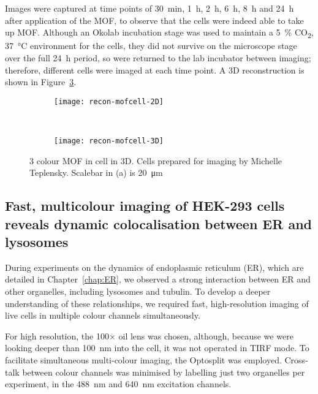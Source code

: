 Images were captured at time points of \SI{30}{\minute}, \SI{1}{\hour}, \SI{2}{\hour}, \SI{6}{\hour}, \SI{8}{\hour} and \SI{24}{\hour} after application of the MOF, to observe that the cells were indeed able to take up MOF.
Although an Okolab incubation stage was used to maintain a \SI{5}{\percent} CO\textsubscript{2}, \SI{37}{\degreeCelsius} environment for the cells, they did not survive on the microscope stage over the full \SI{24}{\hour} period, so were returned to the lab incubator between imaging; therefore, different cells were imaged at each time point. 
A 3D reconstruction is shown in Figure~\ref{fig:recon-mofcell}. 

\begin{figure}[tbp!]
\centering
\begin{subfigure}[b]{0.7\textwidth}
	\texttt{[image: recon-mofcell-2D]}
	\caption{}\label{fig:recon-mofcell-2D}
\end{subfigure}

~\newline
\begin{subfigure}[b]{0.7\textwidth}
	\texttt{[image: recon-mofcell-3D]}
	\caption{}\label{fig:recon-mofcell-3D}
\end{subfigure}
\caption[LAG SIM: 3D reconstruction of HeLa cells]{3 colour MOF in cell in 3D. Cells prepared for imaging by Michelle Teplensky. Scalebar in (a) is \SI{20}{\micro\metre}}
\label{fig:recon-mofcell}
\end{figure}

\subsection{Fast, multicolour imaging of HEK-293 cells reveals dynamic colocalisation between ER and lysosomes}
During experiments on the dynamics of endoplasmic reticulum (ER), which are detailed in Chapter~\ref{chap:ER}, we observed a strong interaction between ER and other organelles, including lysosomes and tubulin. 
To develop a deeper understanding of these relationships, we required fast, high-resolution imaging of live cells in multiple colour channels simultaneously. 

For high resolution, the 100$\times$ oil lens was chosen, although, because we were looking deeper than \SI{100}{\nano\metre} into the cell, it was not operated in TIRF mode. 
To facilitate simultaneous multi-colour imaging, the Optosplit was employed. 
Cross-talk between colour channels was minimised by labelling just two organelles per experiment, in the \SI{488}{\nano\metre} and \SI{640}{\nano\metre} excitation channels. 

